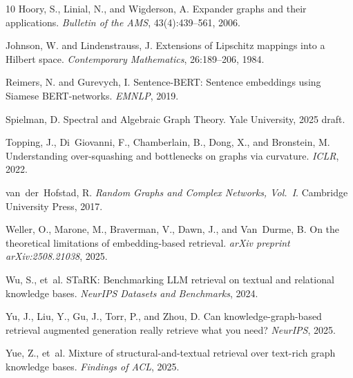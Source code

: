 \documentclass[11pt]{article}
\begin{document}
\begin{thebibliography}{10}
Hoory, S., Linial, N., and Wigderson, A.
\newblock Expander graphs and their applications.
\newblock \textit{Bulletin of the AMS}, 43(4):439--561, 2006.

Johnson, W. and Lindenstrauss, J.
\newblock Extensions of Lipschitz mappings into a Hilbert space.
\newblock \textit{Contemporary Mathematics}, 26:189--206, 1984.

Reimers, N. and Gurevych, I.
\newblock Sentence-BERT: Sentence embeddings using Siamese BERT-networks.
\newblock \textit{EMNLP}, 2019.

Spielman, D.
\newblock Spectral and Algebraic Graph Theory.
\newblock Yale University, 2025 draft.

Topping, J., Di~Giovanni, F., Chamberlain, B., Dong, X., and Bronstein, M.
\newblock Understanding over-squashing and bottlenecks on graphs via curvature.
\newblock \textit{ICLR}, 2022.

van~der~Hofstad, R.
\newblock \textit{Random Graphs and Complex Networks, Vol.\ I}.
\newblock Cambridge University Press, 2017.

Weller, O., Marone, M., Braverman, V., Dawn, J., and Van~Durme, B.
\newblock On the theoretical limitations of embedding-based retrieval.
\newblock \textit{arXiv preprint arXiv:2508.21038}, 2025.

Wu, S., et~al.
\newblock STaRK: Benchmarking LLM retrieval on textual and relational knowledge bases.
\newblock \textit{NeurIPS Datasets and Benchmarks}, 2024.

Yu, J., Liu, Y., Gu, J., Torr, P., and Zhou, D.
\newblock Can knowledge-graph-based retrieval augmented generation really retrieve what you need?
\newblock \textit{NeurIPS}, 2025.

Yue, Z., et~al.
\newblock Mixture of structural-and-textual retrieval over text-rich graph knowledge bases.
\newblock \textit{Findings of ACL}, 2025.

\end{thebibliography}
\end{document}
